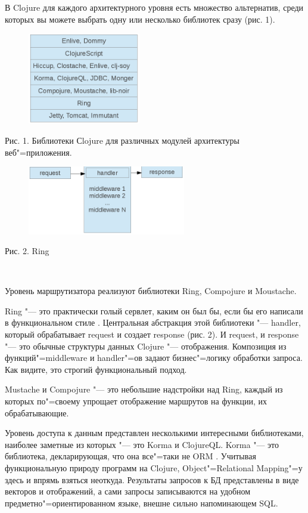 \documentclass[10pt, a5paper]{article}
\begin{document}
В Clojure для каждого архитектурного уровня есть множество альтернатив, среди которых вы можете выбрать одну или несколько библиотек сразу (рис. 1).

\begin{figure} [h!]
  \centering
  \includegraphics[height=4cm]{119_2013_w_figure1}
\end{figure}

Рис. 1. Библиотеки Сlojure для различных модулей архитектуры веб"=приложения.

\begin{figure}[h!]
  \centering
  \includegraphics[height=3cm]{119_2013_w_figure2}
\end{figure}

Рис. 2. Ring

~

Уровень маршрутизатора реализуют библиотеки Ring, \linebreak Compojure и Moustache.

Ring "--- это практически голый сервлет, каким он был бы, если бы его написали в функциональном стиле \cite{Bushenko3}. Центральная абстракция этой библиотеки "--- handler, который обрабатывает request и создает response (рис. 2). И request, и response "--- это обычные структуры данных Clojure "--- отображения. Композиция из функций"=middleware и handler"=ов задают бизнес"=логику обработки запроса. Как видите, это строгий функциональный подход.



Mustache и Compojure "--- это небольшие надстройки над Ring, каждый из которых по"=своему упрощает отображение маршрутов на функции, их обрабатывающие.

Уровень доступа к данным представлен несколькими интересными библиотеками, наиболее заметные из которых "--- это Korma и ClojureQL.
Korma "--- это библиотека, декларирующая, что она все"=таки не ORM \cite{Bushenko4}. Учитывая функциональную природу программ на Clojure, Object"=Relational Mapping"=у здесь и впрямь взяться неоткуда. Результаты запросов к БД представлены в виде векторов и отображений, а сами запросы записываются на удобном предметно"=ориентированном языке, внешне сильно напоминающем SQL.
\end{document}
